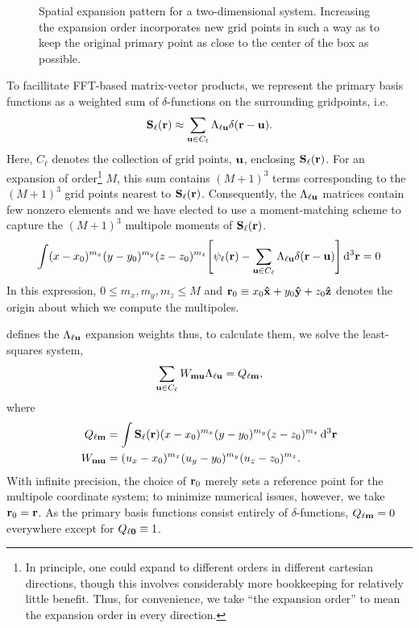 \begin{figure}
  \centering
  \caption{\label{fig:expansion grid}Spatial expansion pattern for a two-dimensional system.
    Increasing the expansion order incorporates new grid points in such a way as to keep the original primary point as close to the center of the box as possible.
  }
\end{figure}

To facillitate FFT-based matrix-vector products, we represent the primary basis functions as a weighted sum of $\delta$-functions on the surrounding gridpoints, i.e.
\begin{equation}
  \vb{S}_\ell(\vb{r}) \approx \sum_{\vb{u} \in C_{\ell}} \Lambda_{\ell\vb{u}} \delta(\vb{r} - \vb{u}).
  \label{eq:grid linear combination}
\end{equation}
Here, $C_\ell$ denotes the collection of grid points, $\vb{u}$, enclosing $\vb{S}_\ell(\vb{r})$.
For an expansion of order\footnote{In principle, one could expand to different orders in different cartesian directions, though this involves considerably more bookkeeping for relatively little benefit. Thus, for convenience, we take ``the expansion order'' to mean the expansion order in every direction.} $M$, this sum contains $(M + 1)^3$ terms corresponding to the $(M + 1)^3$ grid points nearest to $\vb{S}_\ell(\vb{r})$.
Consequently, the $\Lambda_{\ell \vb{u}}$ matrices contain few nonzero elements and we have elected to use a moment-matching scheme to capture the $(M + 1)^3$ multipole moments of $\vb{S}_\ell(\vb{r})$.
\begin{equation}
  \int (x - x_0)^{m_x}(y - y_0)^{m_y}(z - z_0)^{m_z} \qty[\psi_\ell(\vb{r}) - \sum_{\vb{u} \in C_\ell}\Lambda_{\ell\vb{u}}\delta(\vb{r} - \vb{u})] \dd[3]{\vb{r}} = 0
  \label{eq:moment matching}
\end{equation}
In this expression, $0 \le m_x, m_y, m_z \le M$ and $\vb{r}_0 \equiv x_0 \vu{x} + y_0 \vu{y} + z_0\vu{z}$ denotes the origin about which we compute the multipoles.

 defines the $\Lambda_{\ell \vb{u}}$ expansion weights thus, to calculate them, we solve the least-squares system,
\begin{equation}
  \sum_{\vb{u} \in C_\ell} W_{\vb{m}\vb{u}}\Lambda_{\ell\vb{u}} = Q_{\ell\vb{m}},
  \label{eq:expansion matrix system}
\end{equation}
where
\begin{subequations}
  \begin{align}
    Q_{\ell \vb{m}} &= \int \vb{S}_\ell(\vb{r}) (x - x_0)^{m_x} (y - y_0)^{m_y} (z - z_0)^{m_z} \dd[3]{\vb{r}} \label{eq:q vector}\\
    W_{\vb{m}\vb{u}} &= (u_x - x_0)^{m_x} (u_y - y_0)^{m_y} (u_z - z_0)^{m_z} \label{eq:w matrix}.
  \end{align}
\end{subequations}
With infinite precision, the choice of $\vb{r}_0$ merely sets a reference point for the multipole coordinate system; to minimize numerical issues, however, we take $\vb{r}_0 = \vb{r}$.
As the primary basis functions consist entirely of $\delta$-functions, $Q_{\ell\vb{m}} = 0$ everywhere except for $Q_{\ell \vb{0}} \equiv 1$.
